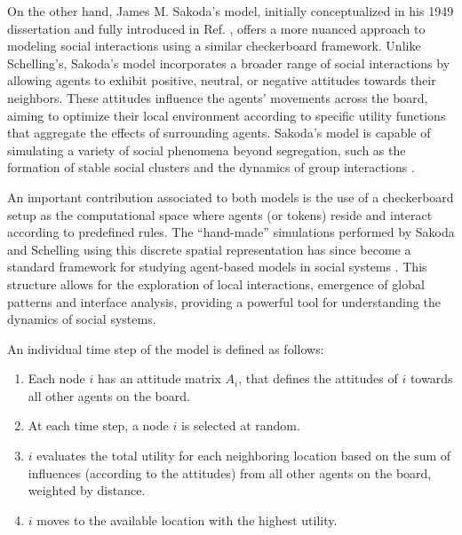 On the other hand, James M. Sakoda's model, initially conceptualized in his 1949 dissertation and fully introduced in Ref. \cite{sakoda1971checkerboard}, offers a more nuanced approach to modeling social interactions using a similar checkerboard framework. Unlike Schelling's, Sakoda's model incorporates a broader range of social interactions by allowing agents to exhibit positive, neutral, or negative attitudes towards their neighbors. These attitudes influence the agents' movements across the board, aiming to optimize their local environment according to specific utility functions that aggregate the effects of surrounding agents. Sakoda's model is capable of simulating a variety of social phenomena beyond segregation, such as the formation of stable social clusters and the dynamics of group interactions \cite{hegselmann-2017}. 

An important contribution associated to both models is the use of a checkerboard setup as the computational space where agents (or tokens) reside and interact according to predefined rules. The ``hand-made'' simulations performed by Sakoda and Schelling using this discrete spatial representation has since become a standard framework for studying agent-based models in social systems \cite{hegselmann-2017}. This structure allows for the exploration of local interactions, emergence of global patterns and interface analysis, providing a powerful tool for understanding the dynamics of social systems.

\begin{theorem}
    \sffamily\small
    An individual time step of the model is defined as follows:
    \begin{enumerate}
        \item Each node $i$ has an attitude matrix $A_i$, that defines the attitudes of $i$ towards all other agents on the board.
        \item At each time step, a node $i$ is selected at random.
        \item $i$ evaluates the total utility for each neighboring location based on the sum of influences (according to the attitudes) from all other agents on the board, weighted by distance.
        \item $i$ moves to the available location with the highest utility.
    \end{enumerate}
\end{theorem}


